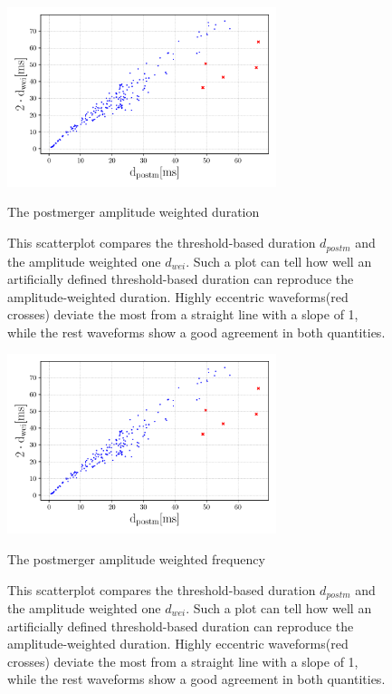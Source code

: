 \begin{figure}[hbt!]
\begin{center}
\includegraphics[width=0.7\textwidth, angle=0]{images/Data_analysis/results/res1.pdf}
\captionsetup{width=0.8\textwidth}
\caption{The postmerger amplitude weighted duration}
\caption*{This scatterplot compares the threshold-based duration $d_{postm}$ and the amplitude weighted one $d_{wei}$. Such a plot can tell how well an artificially defined threshold-based duration can reproduce the amplitude-weighted duration. Highly eccentric waveforms(red crosses) deviate the most from a straight line with a slope of 1, while the rest waveforms show a good agreement in both quantities.}
\label{duration measure}
\end{center}
\end{figure}


\begin{figure}[hbt!]
\begin{center}
\includegraphics[width=0.7\textwidth, angle=0]{images/Data_analysis/results/res1.pdf}
\captionsetup{width=0.8\textwidth}
\caption{The postmerger amplitude weighted frequency}
\caption*{This scatterplot compares the threshold-based duration $d_{postm}$ and the amplitude weighted one $d_{wei}$. Such a plot can tell how well an artificially defined threshold-based duration can reproduce the amplitude-weighted duration. Highly eccentric waveforms(red crosses) deviate the most from a straight line with a slope of 1, while the rest waveforms show a good agreement in both quantities.}
\label{duration measure}
\end{center}
\end{figure}

\FloatBarrier







